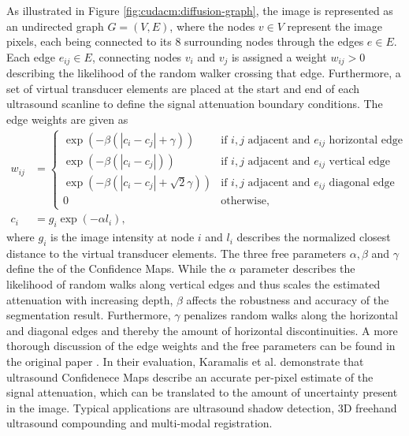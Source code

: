 As illustrated in Figure \ref{fig:cudacm:diffusion-graph}, the image is represented as an undirected graph $G = (V, E)$, where the nodes $v \in V$ represent the image pixels, each being connected to its 8 surrounding nodes through the edges $e \in E$.
Each edge $e_{ij} \in E$, connecting nodes $v_i$ and $v_j$ is assigned a weight $w_{ij} > 0$ describing the likelihood of the random walker crossing that edge.
Furthermore, a set of virtual transducer elements are placed at the start and end of each ultrasound scanline to define the signal attenuation boundary conditions.
The edge weights are given as
\begin{equation}
	\begin{split}
		w_{ij} &= 
			\begin{cases}
				\exp(-\beta (|c_i - c_j| + \gamma))         & \text{if $i, j$ adjacent and $e_{ij}$ horizontal edge} \\
				\exp(-\beta (|c_i - c_j|))                  & \text{if $i, j$ adjacent and $e_{ij}$ vertical edge}   \\
				\exp \left(-\beta (|c_i - c_j| + \sqrt 2 \gamma) \right) & \text{if $i, j$ adjacent and $e_{ij}$ diagonal edge}   \\
				0                                           & \text{otherwise},
			\end{cases} \\
		c_i &= g_i \exp(-\alpha l_i),
	\end{split}
\end{equation}
where $g_i$ is the image intensity at node $i$ and $l_i$ describes the normalized closest distance to the virtual transducer elements.
The three free parameters $\alpha, \beta$ and $\gamma$ define the  of the Confidence Maps.
While the $\alpha$ parameter describes the likelihood of random walks along vertical edges and thus scales the estimated  attenuation with increasing depth, $\beta$ affects the robustness and accuracy of the segmentation result.
Furthermore, $\gamma$ penalizes random walks along the horizontal and diagonal edges and thereby  the amount of horizontal discontinuities.
A more thorough discussion of the edge weights and the free parameters can be found in the original paper \cite{Karamalis:2012:ConfidenceMaps}.
In their evaluation, Karamalis et al. demonstrate that ultrasound Confidenece Maps describe an accurate per-pixel estimate of the signal attenuation, which can be translated to the amount of uncertainty present in the image.
Typical applications are ultrasound shadow detection, 3D freehand ultrasound compounding and multi-modal registration.


